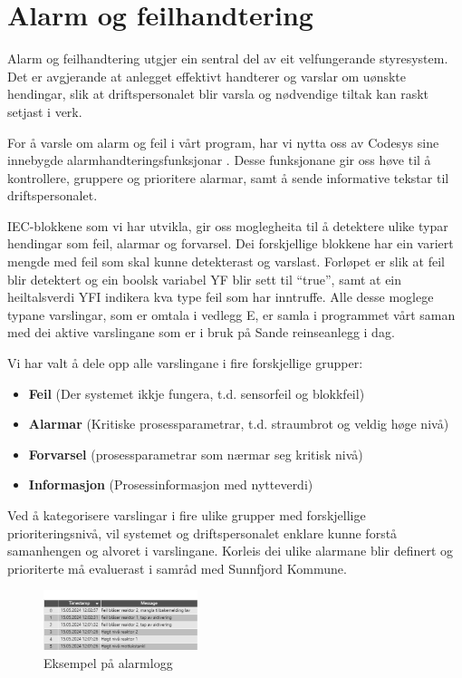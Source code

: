\newpage
\section{Alarm og feilhandtering}
\thispagestyle{fancy}

Alarm og feilhandtering utgjer ein sentral del av eit velfungerande styresystem. Det er avgjerande
at anlegget effektivt handterer og varslar om uønskte hendingar, slik at 
driftspersonalet blir varsla og nødvendige tiltak kan raskt setjast i verk.

For å varsle om alarm og feil i vårt program, har vi nytta oss av \gls{Codesys} sine
innebygde alarmhandteringsfunksjonar \citep{CodesysAlarm}. Desse funksjonane gir oss høve til å 
kontrollere, gruppere og prioritere alarmar, samt å sende informative tekstar til driftspersonalet.

\gls{IEC}-blokkene som vi har utvikla, gir oss moglegheita til å detektere ulike typar hendingar
som feil, alarmar og forvarsel.
Dei forskjellige blokkene har ein variert mengde med feil som skal kunne detekterast og varslast.
Forløpet er slik at feil blir detektert og ein boolsk variabel \gls{YF} blir sett til ``true'', 
samt at ein heiltalsverdi \gls{YFI} indikera kva type feil som har inntruffe.\newline
Alle desse moglege typane varslingar, som er omtala i vedlegg E, 
er samla i programmet vårt saman 
med dei aktive varslingane som er i bruk på Sande reinseanlegg i dag.

Vi har valt å dele opp alle varslingane i fire forskjellige grupper:

\begin{itemize}
    \item \textbf{Feil}          (Der systemet ikkje fungera, t.d. sensorfeil og blokkfeil)
    \item \textbf{Alarmar}       (Kritiske prosessparametrar, t.d. straumbrot og veldig høge nivå)
    \item \textbf{Forvarsel}     (prosessparametrar som nærmar seg kritisk nivå)
    \item \textbf{Informasjon}   (Prosessinformasjon med nytteverdi)
\end{itemize}

Ved å kategorisere varslingar i fire ulike grupper med forskjellige prioriteringsnivå,
vil systemet og driftspersonalet enklare kunne forstå samanhengen og alvoret i varslingane. \newline
Korleis dei ulike alarmane blir definert og prioriterte må evaluerast i samråd med \gls{Sunnfjord Kommune}.




\begin{figure}[htbp]
    \centering
    \includegraphics[width=0.4\textwidth]{Bilder/Alarmeksempel.png}
    \caption{Eksempel på alarmlogg}\label{fig:Alarmlogg}
\end{figure}

\newpage

